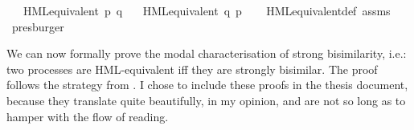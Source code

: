 \begin{isabellebody}
\ \ \ {\isacartoucheopen}HML{\isacharunderscore}{\kern0pt}equivalent\ p\ q{\isacartoucheclose}\isanewline
\ \ \ {\isacartoucheopen}HML{\isacharunderscore}{\kern0pt}equivalent\ q\ p{\isacartoucheclose}\isanewline
%
\isadelimproof
\ \ %
\endisadelimproof
%
\isatagproof
{}\isamarkupfalse%
\ HML{\isacharunderscore}{\kern0pt}equivalent{\isacharunderscore}{\kern0pt}def\ assms\ \isamarkupfalse%
\ presburger%
\endisatagproof
{\isafoldproof}%
%
\isadelimproof
%
\endisadelimproof
%
\begin{isamarkuptext}%
We can now formally prove the modal characterisation of strong bisimilarity, i.e.: two processes are HML-equivalent iff they are strongly bisimilar. The proof follows the strategy from \cite{resyst}. I chose to include these proofs in the thesis document, because they translate quite beautifully, in my opinion, and are not so long as to hamper with the flow of reading.


\end{isamarkuptext}
\end{isabellebody}
